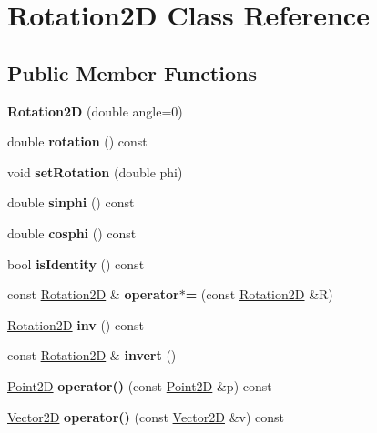 \hypertarget{classRotation2D}{}\section{Rotation2D Class Reference}
\label{classRotation2D}
\subsection*{Public Member Functions}
\begin{DoxyCompactItemize}
\item 
\mbox{\label{classRotation2D_a08b470eb97a95a070e2a066ca1f8c581}} 
{\bfseries Rotation2D} (double angle=0)
\item 
\mbox{\label{classRotation2D_abcde0a19f54143d06d3e2134d48b2707}} 
double {\bfseries rotation} () const
\item 
\mbox{\label{classRotation2D_af5d9239f14615e5bd3be151760b8e992}} 
void {\bfseries set\+Rotation} (double phi)
\item 
\mbox{\label{classRotation2D_a343d0cec4f04943968f4bccb193236fe}} 
double {\bfseries sinphi} () const
\item 
\mbox{\label{classRotation2D_afbe8524e8e90b0800daa8a8f3f5a670e}} 
double {\bfseries cosphi} () const
\item 
\mbox{\label{classRotation2D_a3cb129f9254d0a9a439fb3cdceeb62a4}} 
bool {\bfseries is\+Identity} () const
\item 
\mbox{\label{classRotation2D_abd1a7eb86ccd731900b783eb56977a55}} 
const \hyperlink{classRotation2D}{Rotation2D} \& {\bfseries operator$\ast$=} (const \hyperlink{classRotation2D}{Rotation2D} \&R)
\item 
\mbox{\label{classRotation2D_ae43a62ea41ebd042c2ce80006f8873e1}} 
\hyperlink{classRotation2D}{Rotation2D} {\bfseries inv} () const
\item 
\mbox{\label{classRotation2D_a2500e93474133f1cba7a0d9f4500cb77}} 
const \hyperlink{classRotation2D}{Rotation2D} \& {\bfseries invert} ()
\item 
\mbox{\label{classRotation2D_a6ad83a04e64850dfdb077f2a0c4b4f1c}} 
\hyperlink{classTVec2D}{Point2D} {\bfseries operator()} (const \hyperlink{classTVec2D}{Point2D} \&p) const
\item 
\mbox{\label{classRotation2D_aade2c9af3204a5e8ed31084823d0f90d}} 
\hyperlink{classTVec2D}{Vector2D} {\bfseries operator()} (const \hyperlink{classTVec2D}{Vector2D} \&v) const
\end{DoxyCompactItemize}
